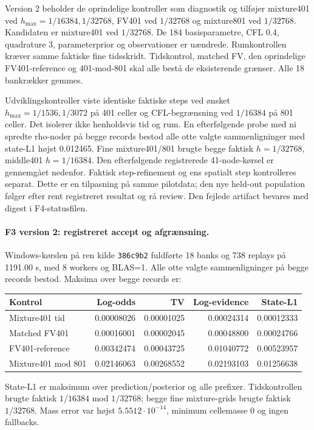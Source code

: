 Version 2 beholder de oprindelige kontroller som diagnostik og tilføjer
mixture401 ved \(h_{\max}=1/16384,1/32768\), FV401 ved \(1/32768\) og
mixture801 ved \(1/32768\). Kandidaten er mixture401 ved \(1/32768\).
De 184 basisparametre, CFL 0.4, quadrature 3, parameterprior og observationer
er uændrede. Rumkontrollen kræver samme faktiske fine tidsskridt.
Tidskontrol, matched FV, den oprindelige FV401-reference og 401-mod-801
skal alle bestå de eksisterende grænser. Alle 18 bankrækker gemmes.

Udviklingskontroller viste identiske faktiske steps ved ønsket
\(h_{\max}=1/1536,1/3072\) på 401 celler og CFL-begrænsning ved
\(1/16384\) på 801 celler. Det isolerer ikke henholdsvis tid og rum.
En efterfølgende probe med ni spredte rho-noder på begge records bestod
alle otte valgte sammenligninger med state-L1 højst 0.012465.
Fine mixture401/801 brugte begge faktisk \(h=1/32768\), middle401
\(h=1/16384\). Den efterfølgende registrerede 41-node-kørsel er gennemgået nedenfor.
Faktisk step-refinement og ens spatialt step kontrolleres separat.
Dette er en tilpasning på samme pilotdata; den nye
held-out population følger efter rent registreret resultat og rå review.
Den fejlede artifact bevares med digest i F4-statusfilen.

\paragraph{F3 version 2: registreret accept og afgrænsning.}
Windows-kørslen på ren kilde \texttt{386c9b2} fuldførte 18 banks og
738 replays på 1191.00 s, med 8 workers og BLAS=1. Alle otte valgte
sammenligninger på begge records bestod. Maksima over begge records er:
\begin{center}
\small
\begin{tabular}{@{}lrrrr@{}}
\toprule
Kontrol & Log-odds & TV & Log-evidence & State-L1\\
\midrule
Mixture401 tid & 0.00008026 & 0.00001025 & 0.00024314 & 0.00012333\\
Matched FV401 & 0.00016001 & 0.00002045 & 0.00048800 & 0.00024766\\
FV401-reference & 0.00342474 & 0.00043725 & 0.01040772 & 0.00523957\\
Mixture401 mod 801 & 0.02146063 & 0.00268552 & 0.02193103 & 0.01256638\\
\bottomrule
\end{tabular}
\end{center}
State-L1 er maksimum over prediction/posterior og alle prefixer.
Tidskontrollen brugte faktisk \(1/16384\) mod \(1/32768\); begge fine
mixture-grids brugte faktisk \(1/32768\). Mass error var højst
\(5.5512\cdot10^{-14}\), minimum cellemasse 0 og ingen fallbacks.

